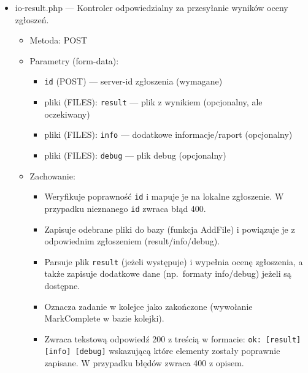 \documentclass[12pt,a4paper]{article}
\begin{document}
\begin{itemize}
    \item io-result.php --- Kontroler odpowiedzialny za przesyłanie wyników oceny zgłoszeń.
          \begin{itemize}
              \item Metoda: POST
              \item Parametry (form-data):
                    \begin{itemize}
                        \item \texttt{id} (POST) --- server-id zgłoszenia (wymagane)
                        \item pliki (FILES): \texttt{result} --- plik z wynikiem (opcjonalny, ale oczekiwany)
                        \item pliki (FILES): \texttt{info} --- dodatkowe informacje/raport (opcjonalny)
                        \item pliki (FILES): \texttt{debug} --- plik debug (opcjonalny)
                    \end{itemize}
              \item Zachowanie:
                    \begin{itemize}
                        \item Weryfikuje poprawność \texttt{id} i mapuje je na lokalne zgłoszenie. W przypadku nieznanego \texttt{id} zwraca błąd 400.
                        \item Zapisuje odebrane pliki do bazy (funkcja AddFile) i powiązuje je z odpowiednim zgłoszeniem (result/info/debug).
                        \item Parsuje plik \texttt{result} (jeżeli występuje) i wypełnia ocenę zgłoszenia, a także zapisuje dodatkowe dane (np.\ formaty info/debug) jeżeli są dostępne.
                        \item Oznacza zadanie w kolejce jako zakończone (wywołanie MarkComplete w bazie kolejki).
                        \item Zwraca tekstową odpowiedź 200 z treścią w formacie: \texttt{ok: [result] [info] [debug]} wskazującą które elementy zostały poprawnie zapisane. W przypadku błędów zwraca 400 z opisem.
                    \end{itemize}
          \end{itemize}
\end{itemize}
\end{document}
